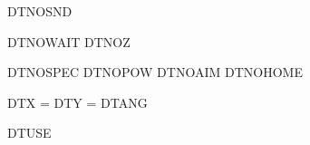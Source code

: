 \expandafter\ifx\csname DTNOSND\endcsname\relax\else\dt@sndfalse\fi
\ifdt@snd \dtBuildSound \fi

\expandafter\ifx\csname DTNOWAIT\endcsname\relax\else\dt@wsmfalse\fi
\expandafter\ifx\csname DTNOZ\endcsname\relax\else\dt@zsightfalse\fi

\expandafter\ifx\csname DTNOSPEC\endcsname\relax\else\dt@specfalse\fi
\expandafter\ifx\csname DTNOPOW\endcsname\relax\else\dt@powfalse\fi
\expandafter\ifx\csname DTNOAIM\endcsname\relax\else\dt@aimfalse\fi
\expandafter\ifx\csname DTNOHOME\endcsname\relax\else\dt@homefalse\fi
\dtSpawnSpecials

\expandafter\ifx\csname DTX\endcsname\relax\else
  \PX=\numexpr{}\relax\fi
\expandafter\ifx\csname DTY\endcsname\relax\else
  \PY=\numexpr{}\relax\fi
\expandafter\ifx\csname DTANG\endcsname\relax\else
  \dtnorm\PA{\DTANG}\fi

\dtSetupPDF
\dtLocatePlayer
\dtSnapFloor
{}

\expandafter\ifx\csname DTUSE\endcsname\relax
  \def\dtUseStep{}
\else
  \def\dtUseStep{\dt@useholdtrue\dtUse\dt@useholdfalse}
\fi

